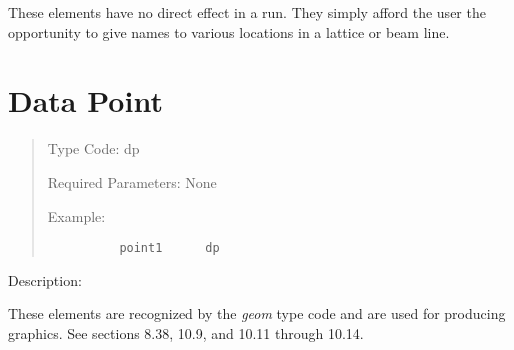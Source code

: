      These elements have no direct effect in a \Mary run.  They simply
	 afford the user the opportunity to give names to various locations in a lattice or beam line.

\newpage



\section{Data Point}
\begin{quotation}
\noindent Type Code:  dp
\vspace{5mm}

\noindent Required Parameters:  None

\vspace{5mm}
\noindent Example:
\begin{verbatim}
          point1      dp
\end{verbatim}
\end{quotation}

\vspace{5mm}
     Description:
\vspace{2mm}

     These elements are recognized by the {\em geom} type code and are
	 used for producing graphics.  See sections 8.38, 10.9, and 10.11
	 through 10.14.

\newpage


